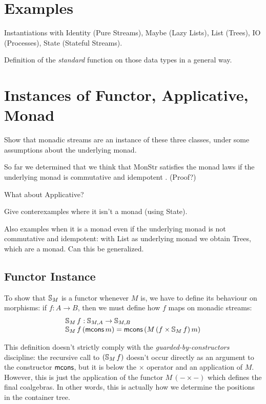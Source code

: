 \documentclass{article}
\begin{document}
\section{Examples}

Instantiations with Identity (Pure Streams), Maybe (Lazy Lists), List (Trees), IO (Processes), State (Stateful Streams).

Definition of the {\em standard} function on those data types in a general way.

\section{Instances of Functor, Applicative, Monad}

Show that monadic streams are an instance of these three classes, under some assumptions about the underlying monad.

So far we determined that we think that MonStr satisfies the monad laws if the underlying monad is commutative and idempotent \cite{idempotent_monads}. (Proof?)

What about Applicative?

Give conterexamples where it isn't a monad (using State).

Also examples when it is a monad even if the underlying monad is not commutative and idempotent: with List as underlying monad we obtain Trees, which are a monad. Can this be generalized.

\subsection{Functor Instance}

To show that $\mathbb{S}_{M}$ is a functor whenever $M$ is, we have to define its behaviour on morphisms: if $f:A\rightarrow B$, then we must define how $f$ maps on monadic streams:
$$
\begin{array}{l}
\mathbb{S}_{M}\,f : \mathbb{S}_{M,A} \rightarrow \mathbb{S}_{M,B}\\
\mathbb{S}_{M}\,f\,(\mathsf{mcons}\,m) = \mathsf{mcons}\,(M\,(f\times \mathbb{S}_{M}\,f)\,m)
\end{array}
$$

This definition doesn't strictly comply with the {\em guarded-by-constructors} discipline: the recursive call to $(\mathbb{S}_{M}\,f)$ doesn't occur directly as an argument to the constructor $\mathsf{mcons}$, but it is below the $\times$ operator and an application of $M$.
However, this is just the application of the functor $M\,(- \times -)$ which defines the final coalgebras. In other words, this is actually how we determine the positions in the container tree.
\end{document}
